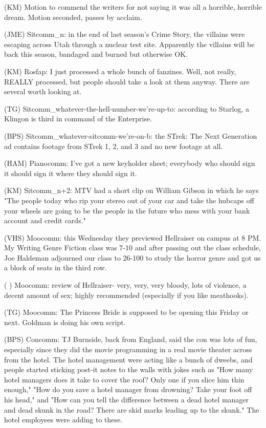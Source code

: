 \documentclass[12pt]{article}
\begin{document}
(KM) Motion to commend the writers for not saying it was all a horrible, horrible dream. Motion seconded, passes by acclaim.

(JME) Sitcomm_n: in the end of last season's Crime Story, the villains were escaping across Utah through a nuclear test site. Apparently the villains will be back this season, bandaged and burned but otherwise OK.

(KM) Rosfap: I just processed a whole bunch of fanzines. Well, not really, REALLY processed, but people should take a look at them anyway. There are several worth looking at.

(TG) Sitcomm_whatever-the-hell-number-we're-up-to: according to Starlog, a Klingon is third in command of the Enterprise.

(BPS) Sitcomm_whatever-sitcomm-we're-on-b: the STrek: The Next Generation ad contains footage from STrek 1, 2, and 3 and no new footage at all.

(HAM) Pianocomm: I've got a new keyholder sheet; everybody who should sign it should sign it where they should sign it.

(KM) Sitcomm_n+2: MTV had a short clip on William Gibson in which he says "The people today who rip your stereo out of your car and take the hubcaps off your wheels are going to be the people in the future who mess with your bank account and credit cards."

(VHS) Moocomm: this Wednesday they previewed Hellraiser on campus at 8 PM. My Writing Genre Fiction class was 7-10 and after passing out the class schedule, Joe Haldeman adjourned our class to 26-100 to study the horror genre and got us a block of seats in the third row.

( ) Moocomm: review of Hellraiser- very, very, very bloody, lots of violence, a decent amount of sex; highly recommended (especially if you like meathooks).

(TG) Moocomm: The Princess Bride is supposed to be opening this Friday or next. Goldman is doing his own script.

(BPS) Concomm: TJ Burnside, back from England, said the con was lots of fun, especially since they did the movie programming in a real movie theater across from the hotel. The hotel management were acting like a bunch of dweebs, and people started sticking post-it notes to the walls with jokes such as "How many hotel managers does it take to cover the roof? Only one if you slice him thin enough," "How do you save a hotel manager from drowning? Take your foot off his head," and "How can you tell the difference between a dead hotel manager and dead skunk in the road? There are skid marks leading up to the skunk." The hotel employees were adding to these.
\end{document}
